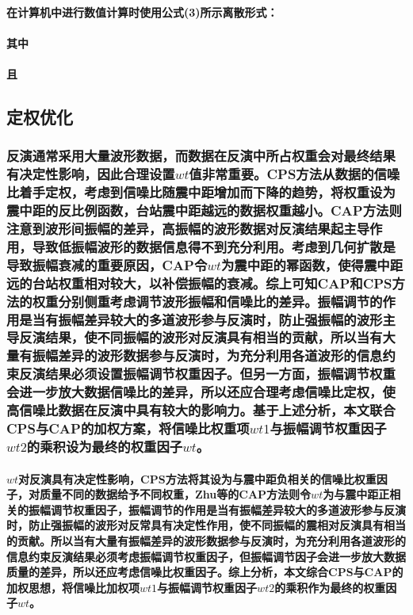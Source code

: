 \documentclass[a4paper,12pt,single,pdftex]{scrartcl}
\begin{document}
\label{ID_143427010}\paragraph{在计算机中进行数值计算时使用公式(3)所示离散形式：}

\label{ID_247138940}\paragraph{其中}

\label{ID_457268259}\paragraph{且}

\label{ID_31082694}\paragraph{}

\label{ID_1003053734}\subsection{定权优化}

\label{ID_975012270}\subsubsection{反演通常采用大量波形数据，而数据在反演中所占权重会对最终结果有决定性影响，因此合理设置$wt$值非常重要。CPS方法从数据的信噪比着手定权，考虑到信噪比随震中距增加而下降的趋势，将权重设为震中距的反比例函数，台站震中距越远的数据权重越小。CAP方法\cite{Zhu1996}则注意到波形间振幅的差异，高振幅的波形数据对反演结果起主导作用，导致低振幅波形的数据信息得不到充分利用。考虑到几何扩散是导致振幅衰减的重要原因，CAP令$wt$为震中距的幂函数，使得震中距远的台站权重相对较大，以补偿振幅的衰减。综上可知CAP和CPS方法的权重分别侧重考虑调节波形振幅和信噪比的差异。振幅调节的作用是当有振幅差异较大的多道波形参与反演时，防止强振幅的波形主导反演结果，使不同振幅的波形对反演具有相当的贡献，所以当有大量有振幅差异的波形数据参与反演时，为充分利用各道波形的信息约束反演结果必须设置振幅调节权重因子。但另一方面，振幅调节权重会进一步放大数据信噪比的差异，所以还应合理考虑信噪比定权，使高信噪比数据在反演中具有较大的影响力。基于上述分析，本文联合CPS与CAP的加权方案，将信噪比权重项$wt1$与振幅调节权重因子$wt2$的乘积设为最终的权重因子$wt$。}

\label{ID_1260250456}\paragraph{$wt$对反演具有决定性影响，CPS方法将其设为与震中距负相关的信噪比权重因子，对质量不同的数据给予不同权重，Zhu等\cite{Zhu1996}的CAP方法则令$wt$为与震中距正相关的振幅调节权重因子，振幅调节的作用是当有振幅差异较大的多道波形参与反演时，防止强振幅的波形对反常具有决定性作用，使不同振幅的震相对反演具有相当的贡献。所以当有大量有振幅差异的波形数据参与反演时，为充分利用各道波形的信息约束反演结果必须考虑振幅调节权重因子，但振幅调节因子会进一步放大数据质量的差异，所以还应考虑信噪比权重因子。综上分析，本文综合CPS与CAP的加权思想，将信噪比加权项$wt1$与振幅调节权重因子$wt2$的乘积作为最终的权重因子$wt$。}
\end{document}
